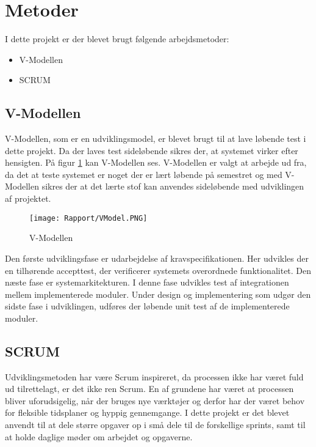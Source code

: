 \section{Metoder}

I dette projekt er der blevet brugt følgende arbejdsmetoder:
\begin{itemize}
	\item V-Modellen
	\item SCRUM
	
\end{itemize}

\subsection{V-Modellen}

V-Modellen, som er en udviklingsmodel, er blevet brugt til at lave løbende test i dette projekt. Da der laves test sideløbende sikres der, at systemet virker efter hensigten. På figur \ref{VModel} kan V-Modellen ses. V-Modellen er valgt at arbejde ud fra, da det at teste systemet er noget der er lært løbende på semestret og med V-Modellen sikres der at det lærte stof kan anvendes sideløbende med udviklingen af projektet. 

\begin{figure}[H]
	\centering
	\texttt{[image: Rapport/VModel.PNG]}
	\caption{V-Modellen}
	\label{VModel}
\end{figure} 
Den første udviklingsfase er udarbejdelse af kravspecifikationen. Her udvikles der en tilhørende accepttest, der verificerer systemets overordnede funktionalitet. Den næste fase er systemarkitekturen.
I denne fase udvikles test af integrationen mellem implementerede moduler. Under design og implementering som udgør den sidste fase i udviklingen, udføres der løbende unit test af de implementerede moduler.

\subsection{SCRUM}
Udviklingsmetoden har være Scrum inspireret, da processen ikke har været fuld ud tilrettelagt, er det ikke ren Scrum. En af grundene har været at processen bliver uforudsigelig, når der bruges nye værktøjer og derfor har der været behov for fleksible tidsplaner og hyppig gennemgange. 
\newline
\newline
I dette projekt er det blevet anvendt til at dele større opgaver op i små dele til de forskellige sprints, samt til at holde daglige møder om arbejdet og opgaverne. 


